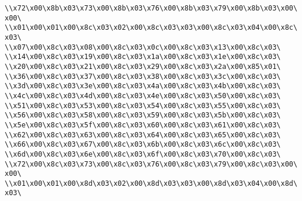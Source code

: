 \verb|\\x72\x00\x8b\x03\x73\x00\x8b\x03\x76\x00\x8b\x03\x79\x00\x8b\x03\x00\x00\|\newline
\verb|\\x01\x00\x01\x00\x8c\x03\x02\x00\x8c\x03\x03\x00\x8c\x03\x04\x00\x8c\x03\|\newline
\verb|\\x07\x00\x8c\x03\x08\x00\x8c\x03\x0c\x00\x8c\x03\x13\x00\x8c\x03\|\newline
\verb|\\x14\x00\x8c\x03\x19\x00\x8c\x03\x1a\x00\x8c\x03\x1e\x00\x8c\x03\|\newline
\verb|\\x20\x00\x8c\x03\x21\x00\x8c\x03\x29\x00\x8c\x03\x2a\x00\x85\x01\|\newline
\verb|\\x36\x00\x8c\x03\x37\x00\x8c\x03\x38\x00\x8c\x03\x3c\x00\x8c\x03\|\newline
\verb|\\x3d\x00\x8c\x03\x3e\x00\x8c\x03\x4a\x00\x8c\x03\x4b\x00\x8c\x03\|\newline
\verb|\\x4c\x00\x8c\x03\x4d\x00\x8c\x03\x4e\x00\x8c\x03\x50\x00\x8c\x03\|\newline
\verb|\\x51\x00\x8c\x03\x53\x00\x8c\x03\x54\x00\x8c\x03\x55\x00\x8c\x03\|\newline
\verb|\\x56\x00\x8c\x03\x58\x00\x8c\x03\x59\x00\x8c\x03\x5b\x00\x8c\x03\|\newline
\verb|\\x5e\x00\x8c\x03\x5f\x00\x8c\x03\x60\x00\x8c\x03\x61\x00\x8c\x03\|\newline
\verb|\\x62\x00\x8c\x03\x63\x00\x8c\x03\x64\x00\x8c\x03\x65\x00\x8c\x03\|\newline
\verb|\\x66\x00\x8c\x03\x67\x00\x8c\x03\x6b\x00\x8c\x03\x6c\x00\x8c\x03\|\newline
\verb|\\x6d\x00\x8c\x03\x6e\x00\x8c\x03\x6f\x00\x8c\x03\x70\x00\x8c\x03\|\newline
\verb|\\x72\x00\x8c\x03\x73\x00\x8c\x03\x76\x00\x8c\x03\x79\x00\x8c\x03\x00\x00\|\newline
\verb|\\x01\x00\x01\x00\x8d\x03\x02\x00\x8d\x03\x03\x00\x8d\x03\x04\x00\x8d\x03\|\newline
